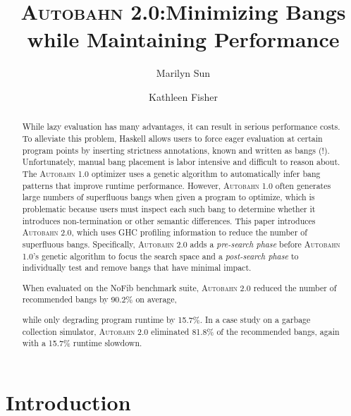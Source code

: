 \documentclass[format=sigplan, review=true, 9pt]{acmart}
\newcommand{\cut}[1]{}
\newcommand{\acut}[1]{}
\newcommand{\Ao}[0]{\textsc{Autobahn 1.0}}
\newcommand{\At}[0]{\textsc{Autobahn 2.0}}
\newcommand{\preopt}[0]{pre-search}
\newcommand{\postopt}[0]{post-search}
\begin{document}
\title{\At:\break Minimizing Bangs while Maintaining Performance}
\author{Marilyn Sun}
\author{Kathleen Fisher}
\begin{abstract}

While lazy evaluation has many advantages, it can result in serious
performance costs. To alleviate this problem, Haskell allows users to
force eager evaluation at certain program points by inserting
strictness annotations, known and written as bangs (!).
Unfortunately, manual bang placement
is labor intensive and difficult to reason about. The \Ao{}
optimizer uses a genetic algorithm to automatically infer bang patterns
that improve runtime performance. However, \Ao{} often generates
large numbers of superfluous bangs when given a program to optimize,
which is problematic because users must inspect each such bang to
determine whether it introduces non-termination or other semantic
differences. 
This paper introduces \At, which uses GHC
profiling information to reduce the number of superfluous bangs.
Specifically,
\At{} adds a \textit{\preopt{} phase} before \Ao's genetic algorithm
to focus the search space and a \textit{\postopt{} phase} to individually test
and remove bangs that have minimal impact. 
\cut{When evaluated on the NoFib
benchmark, the \preopt{} phase on average eliminated 45~locations for
potential bang placement per 100~LOC and reduced the number of bangs
eventually generated by 12.21\%. Overall, }
When evaluated on the NoFib benchmark suite, 
\At{} reduced the number of recommended bangs by 90.2\% on average,
\cut{\At{} reduces the number of
bangs generated from 11~bangs/100~LOC to 1 bang/100~LOC, }
while only degrading program runtime by 15.7\%. 
In a case study on a garbage collection simulator, 
\At{} eliminated 81.8\% of the recommended bangs, again with a
15.7\% runtime slowdown.
\acut{
 Finally, it eliminated 91.3\% bangs with almost no runtime slowdown on
the \texttt{Aeson} parser library.}
\end{abstract}
\maketitle

\section{Introduction}
\end{document}
